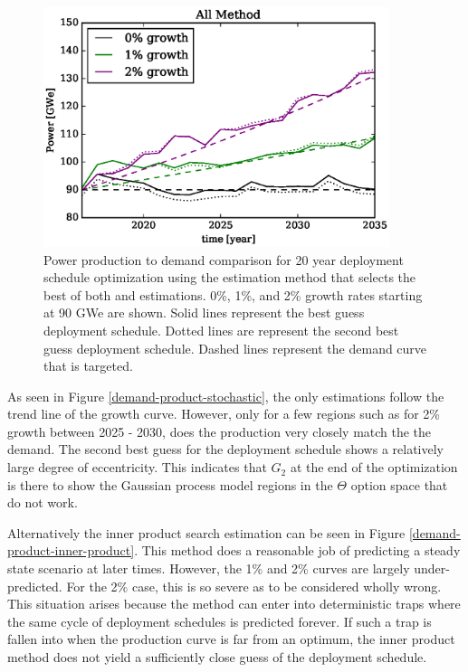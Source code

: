 \begin{figure}[htb]
\centering
\includegraphics[width=0.9\textwidth]{demand-product-all.eps}
\caption{Power production to demand comparison for 20 year deployment
schedule optimization using the \allflag estimation method that selects the
best of both \stochastic and \innerprod estimations.
0\%, 1\%, and 2\% growth rates starting at 90 GWe are shown. Solid lines
represent the best guess deployment schedule.  Dotted lines are represent
the second best guess deployment schedule. Dashed lines represent the
demand curve that is targeted.}
\label{demand-product-all}
\end{figure}

As seen in Figure \ref{demand-product-stochastic}, the \stochastic only
estimations follow the trend line of the growth curve.  However, only for
a few regions such as for 2\% growth between 2025 - 2030, does the
production very closely match the the demand.  The second best guess for the
deployment schedule shows a relatively large degree of eccentricity. This
indicates that $G_2$ at the end of the optimization is there to show the
Gaussian process model regions in the $\Theta$ option space that do not work.

Alternatively the inner product search estimation can be seen in Figure
\ref{demand-product-inner-product}. This method does a reasonable job of
predicting a steady state scenario at later times. However, the 1\% and 2\%
curves are largely under-predicted.  For the 2\% case, this is so severe
as to be considered wholly wrong. This situation arises because the
\innerprod method can enter into deterministic traps where the same cycle
of deployment schedules is predicted forever.  If such a trap is fallen
into when the
production curve is far from an optimum, the inner product method does not
yield a sufficiently close guess of the deployment schedule.

